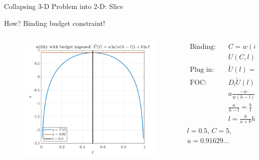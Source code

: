 \documentclass[11pt,aspectratio=43]{beamer}
\theoremstyle{definition}
\begin{document}
\begin{frame}{Collapsing 3-D Problem into 2-D: Slice}
\label{slide:Collapsing_3_D_Problem_into_2_D_Slice}
\begin{center}
    How? Binding budget constraint!
\end{center}
\begin{columns}
    \begin{column}{0.5\textwidth}
        \begin{figure}
            \includegraphics[width=\textwidth]{./figures/UtilityBudget2C.png}
        \end{figure}
    \end{column}
    \begin{column}{0.5\textwidth}
        \begin{align*}
            \text{Binding:} \quad
                & C = w ( h-l )
            \\
                & U( C, l ) = a \ln C + b \ln l
            \\
            \text{Plug in:} \quad
                & \tilde{U}( l ) = a \ln ( w( h-l ) ) + b \ln l
            \\
            \text{FOC:} \quad
                & D_{l}\tilde{U}( l ) = 0
            \\
                & a \frac{-w}{w( h-l )} + b \frac{1}{l} = 0
            \\
                & \frac{a}{h-l} = \frac{b}{l}
            \\
                & l = \frac{b}{a+b} h
        \end{align*}
        $ l = 0.5 $, $ C =  5$, $ u = 0.91629... $
    \end{column}
\end{columns}
\end{frame}
\end{document}

